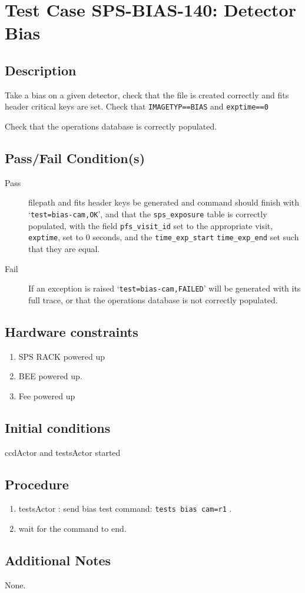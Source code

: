 \section{Test Case SPS-BIAS-140: Detector Bias}

\subsection{Description}

Take a bias on a given detector, check that the file is created correctly and fits header critical keys are set.
Check that \texttt{IMAGETYP==BIAS} and \texttt{exptime==0}

Check that the operations database is correctly populated.

\subsection{Pass/Fail Condition(s)}

\begin{description}

\item [Pass] filepath and fits header keys be generated and command should finish with `\texttt{test=bias-cam,OK}', 
and that the \texttt{sps\_exposure} table is correctly populated, 
with the field \texttt{pfs\_visit\_id} set to the appropriate visit, \texttt{exptime}, set to 0 seconds, 
and the \texttt{time\_exp\_start} \texttt{time\_exp\_end} set such that they are equal.

\item [Fail] If an exception is raised `\texttt{test=bias-cam,FAILED}' will be generated with its full trace, 
or that the operations database is not correctly populated.

\end{description}

\subsection{Hardware constraints}

\begin{enumerate}
    \item SPS RACK powered up
    \item \acrshort{BEE} powered up.
    \item Fee powered up
\end{enumerate}

\subsection{Initial conditions}

ccdActor and testsActor started

\subsection{Procedure}

\begin{enumerate}
    \item testsActor : send bias test command: \texttt{tests bias cam=r1} .
    \item wait for the command to end.
\end{enumerate}

\subsection{Additional Notes}
None.
